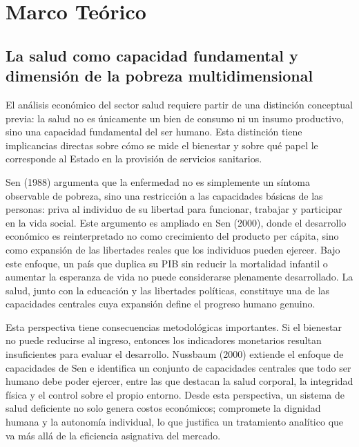 \documentclass[12pt]{article}
\begin{document}

\section{Marco Teórico}

\subsection{La salud como capacidad fundamental y dimensión de la pobreza multidimensional}

El análisis económico del sector salud requiere partir de una distinción conceptual previa: la salud
no es únicamente un bien de consumo ni un insumo productivo, sino una capacidad fundamental del
ser humano. Esta distinción tiene implicancias directas sobre cómo se mide el bienestar y sobre qué
papel le corresponde al Estado en la provisión de servicios sanitarios.

Sen (1988) argumenta que la enfermedad no es simplemente un síntoma observable de pobreza,
sino una restricción a las capacidades básicas de las personas: priva al individuo de su libertad para
funcionar, trabajar y participar en la vida social. Este argumento es ampliado en Sen (2000), donde
el desarrollo económico es reinterpretado no como crecimiento del producto per cápita, sino como
expansión de las libertades reales que los individuos pueden ejercer. Bajo este enfoque, un país que
duplica su PIB sin reducir la mortalidad infantil o aumentar la esperanza de vida no puede
considerarse plenamente desarrollado. La salud, junto con la educación y las libertades políticas,
constituye una de las capacidades centrales cuya expansión define el progreso humano genuino.

Esta perspectiva tiene consecuencias metodológicas importantes. Si el bienestar no puede
reducirse al ingreso, entonces los indicadores monetarios resultan insuficientes para evaluar el
desarrollo. Nussbaum (2000) extiende el enfoque de capacidades de Sen e identifica un conjunto de
capacidades centrales que todo ser humano debe poder ejercer, entre las que destacan la salud
corporal, la integridad física y el control sobre el propio entorno. Desde esta perspectiva, un sistema
de salud deficiente no solo genera costos económicos; compromete la dignidad humana y la
autonomía individual, lo que justifica un tratamiento analítico que va más allá de la eficiencia
asignativa del mercado.
\end{document}
